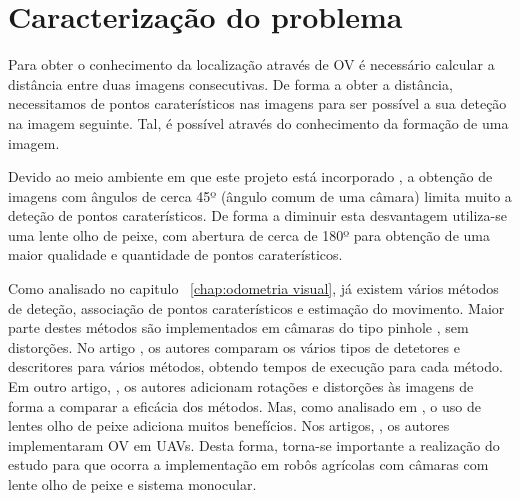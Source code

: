 \chapter{Caracterização do problema}\label{chap:chap4}

Para obter o conhecimento da localização através de OV é necessário calcular a distância entre duas imagens consecutivas. De forma a obter a distância, necessitamos de pontos caraterísticos nas imagens para ser possível a sua deteção na imagem seguinte. Tal, é possível através do conhecimento da formação de uma imagem.

Devido ao meio ambiente em que este projeto está incorporado , a obtenção de imagens com ângulos de cerca 45º (ângulo comum de uma câmara)  limita muito a deteção de pontos caraterísticos. De forma a diminuir esta desvantagem utiliza-se uma lente olho de peixe, com abertura de cerca de 180º para obtenção de  uma maior qualidade e quantidade de pontos caraterísticos. 

Como analisado no capitulo ~\ref{chap:odometria visual}, já existem vários métodos de deteção, associação de pontos caraterísticos e estimação do movimento. Maior parte destes métodos são implementados em câmaras do tipo pinhole , sem distorções. No artigo \cite{6460718}, os autores comparam os vários tipos de detetores e descritores para vários métodos, obtendo tempos de execução para cada método. Em outro artigo, \cite{ImagMatch}, os autores adicionam rotações e distorções às imagens de forma a comparar a eficácia dos métodos. Mas, como analisado em \cite{Zhang2016}, o uso de lentes olho de peixe adiciona muitos benefícios.  Nos artigos, \cite{Forster2014,Forster2017} , os autores implementaram OV em UAVs. Desta forma, torna-se importante a realização do estudo para que ocorra a implementação em  robôs agrícolas com câmaras com lente olho de peixe e sistema monocular.
